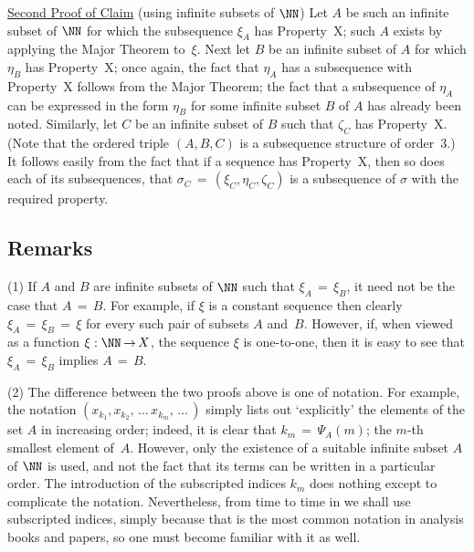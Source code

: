 \VA

        \underline{Second Proof of Claim} (using infinite subsets of ${\NN}$)  Let $A$ be such an infinite subset of ${\NN}$ for which the subsequence 
    ${\xi}_{A}$ has Property~X; such $A$ exists by applying the Major Theorem to~${\xi}$.
    Next let $B$ be an infinite subset of $A$ for which ${\eta}_{B}$ has Property~X;
    once again, the fact that ${\eta}_{A}$ has a subsequence with Property~X follows from the Major Theorem;
    the fact that a subsequence of ${\eta}_{A}$ can be expressed in the form ${\eta}_{B}$ for some infinite subset $B$ of $A$ has already been noted.
    Similarly, let $C$ be an infinite subset of $B$ such that ${\zeta}_{C}$ has Property~X.
    (Note that the ordered triple $(A,B,C)$ is a subsequence structure of order~$3$.)
    It follows easily from the fact that if a sequence has Property~X, then so does each of its subsequences,
    that ${\sigma}_{C} \,=\, ({\xi}_{C}, {\eta}_{C}, {\zeta}_{C})$ is a subsequence of ${\sigma}$ with the required property.


\VV

        \subsection{\small{{\bf Remarks}}}
        \label{RemrkA40.42C}

\V

\hspace*{\parindent}(1) If $A$ and $B$ are infinite subsets of ${\NN}$ such that ${\xi}_{A} \,=\, {\xi}_{B}$, it need not be the case that $A \,=\, B$.
    For example, if ${\xi}$ is a constant sequence then clearly ${\xi}_{A} \,=\, {\xi}_{B} \,=\, {\xi}$ for every such pair of subsets $A$ and~$B$.
    However, if, when viewed as a function ${\xi}:{\NN} \,{\rightarrow}\, X$, the sequence ${\xi}$ is one-to-one,
    then it is easy to see that ${\xi}_{A} \,=\, {\xi}_{B}$ implies $A \,=\, B$.


\V

        (2) The difference between the two proofs above is one of notation. For example,
    the notation $(x_{k_{1}}, x_{k_{2}},\,{\ldots}\,x_{k_{m}},\,{\ldots}\,)$ simply lists out `explicitly' the elements of the set $A$ in increasing order;
    indeed, it is clear that $k_{m} \,=\, {\Psi}_{A}(m)$; the $m$-th smallest element of~$A$.
    However, only the existence of a suitable infinite subset $A$ of ${\NN}$ is used, and not the fact that its terms can be written in a particular order.
    The introduction of the subscripted indices $k_{m}$ does nothing except to complicate the notation.
    Nevertheless, from time to time in {\ThisText} we shall use subscripted indices,
    simply because that is the most common notation in analysis books and papers, so one must become familiar with it as well.


